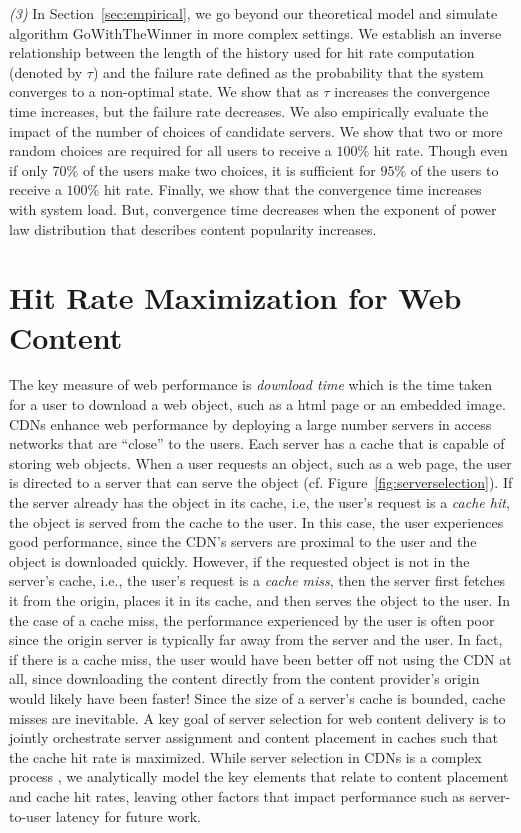 \documentclass[conference]{IEEEtran}
\begin{document}
{\em (3)} In Section~\ref{sec:empirical}, we go beyond our theoretical model and simulate algorithm $\textrm{GoWithTheWinner}$ in more complex settings. We establish an inverse relationship between the length of the history used for hit rate computation (denoted by  $\tau$) and the failure rate defined as the probability that the system converges to a non-optimal state. We show that as $\tau$ increases the convergence time increases, but the failure rate decreases. We  also empirically evaluate the impact of the number of choices of candidate servers. We show that two or more random choices are required for all users to receive a $100\%$ hit rate. Though even if only  70\% of the users  make two choices,  it is sufficient for $95\%$  of the users to receive a $100\%$ hit rate. Finally, we show that the convergence time increases with system load. But, convergence time decreases when the exponent of power law distribution that describes content popularity increases. 


\section{Hit Rate Maximization for Web Content}
\label{sec:maxhitrate}
The key measure of web performance is {\em download time} which is the  time taken for a user to download a web object, such as a html page or an embedded image. CDNs enhance web performance by deploying a large number servers in access networks that are ``close'' to the users. Each server has a cache that is capable of storing web objects. When a user requests an object, such as a web page,  the user is directed to a server that can serve the object (cf. Figure~\ref{fig:serverselection}). If the server already has the object in its cache, i.e, the user's request is a  {\em cache hit}, the object is served from the cache to the user. In this case, the user experiences good performance, since the CDN's servers are proximal to the user and the object is downloaded quickly.  However, if the requested object is not in the server's cache, i.e., the user's request is a {\em cache miss}, then the server first fetches it from the origin, places it in its cache, and then serves the object to the user. In the case of a cache miss, the performance experienced by the user is often poor since the origin server is typically far away from the server and the user. In fact, if there is a cache miss, the user would have been better off not using the CDN at all, since downloading the content directly from the content provider's origin would likely have been faster!  Since the size of a server's cache is bounded, cache misses are inevitable.  A key goal of server selection for web content delivery is to jointly orchestrate server assignment and content placement in caches such that the cache hit rate is maximized. While server selection in CDNs is a complex process \cite{nygren2010akamai}, we analytically model the key elements that relate to content placement and cache hit rates,  leaving other factors that impact performance such as server-to-user latency for future work. 
\end{document}
